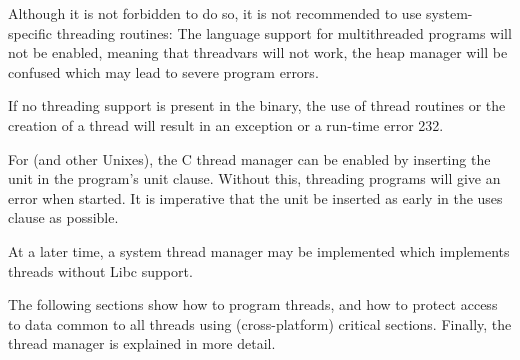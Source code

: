 Although it is not forbidden to do so, it is not recommended to use system-specific 
threading routines: The language support for multithreaded programs will not be 
enabled, meaning that threadvars will not work, the heap manager will be confused 
which may lead to severe program errors.

If no threading support is present in the binary, the use of thread routines
or the creation of a thread will result in an exception or a run-time error 232.

For \linux (and other Unixes), the C thread manager can be enabled by inserting the
 unit in the program's unit clause. Without this, threading programs 
will give an error when started. It is imperative that the unit be inserted
as early in the uses clause as possible.

At a later time, a system thread manager may be implemented which implements threads
without Libc support.

The following sections show how to program threads, and how to protect access to
data common to all threads using (cross-platform) critical sections. 
Finally, the thread manager is explained in more detail.

